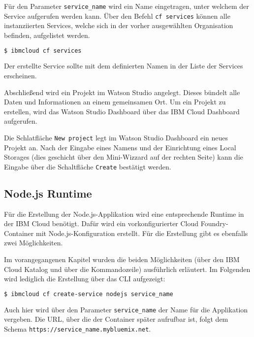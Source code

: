 Für den Parameter \texttt{service\_name} wird ein Name eingetragen, unter welchem der Service aufgerufen werden kann.
Über den Befehl \texttt{cf services} können alle instanziierten Services, welche sich in der vorher ausgewählten
Organisation befinden, aufgelistet werden.

\begin{lstlisting}[language=bash, caption=Auflisten aller Services in einer Organisation, label=Auflisten aller Services in einer Organisation]
    $ ibmcloud cf services
\end{lstlisting}

Der erstellte Service sollte mit dem definierten Namen in der Liste der Services erscheinen.

Abschließend wird ein Projekt im Watson Studio angelegt. Dieses bündelt alle Daten und Informationen an einem gemeinsamen
Ort. Um ein Projekt zu erstellen, wird das Watson Studio Dashboard über das IBM Cloud Dashboard aufgerufen.

Die Schlatfläche \texttt{New project} legt im Watson Studio Dashboard ein neues Projekt an. Nach der Eingabe
eines Namens und der Einrichtung eines Local Storages (dies geschicht über den Mini-Wizzard auf der rechten Seite) kann
die Eingabe über die Schaltfläche \texttt{Create} bestätigt werden.

\subsection{Node.js Runtime}
\label{ssc:nodejs_runtime}
Für die Erstellung der Node.js-Applikation wird eine entsprechende Runtime in der IBM Cloud benötigt. Dafür wird ein
vorkonfigurierter Cloud Foundry-Container mit Node.js-Konfiguration erstellt. Für die Erstellung gibt es ebenfalls zwei
Möglichkeiten.

Im vorangegangenen Kapitel wurden die beiden Möglichkeiten (über den IBM Cloud Katalog und über die Kommandozeile)
ausführlich erläutert. Im Folgenden wird lediglich die Erstellung über das CLI aufgezeigt:

\begin{lstlisting}[language=bash, caption=Instanziierung der Node.js Runtime, label=Instanziierung der Node.JS Runtime]
    $ ibmcloud cf create-service nodejs service_name
\end{lstlisting}

Auch hier wird über den Parameter \texttt{service\_name} der Name für die Applikation vergeben. Die URL, über die
der Container später aufrufbar ist, folgt dem Schema \texttt{https://service\_name.mybluemix.net}.

